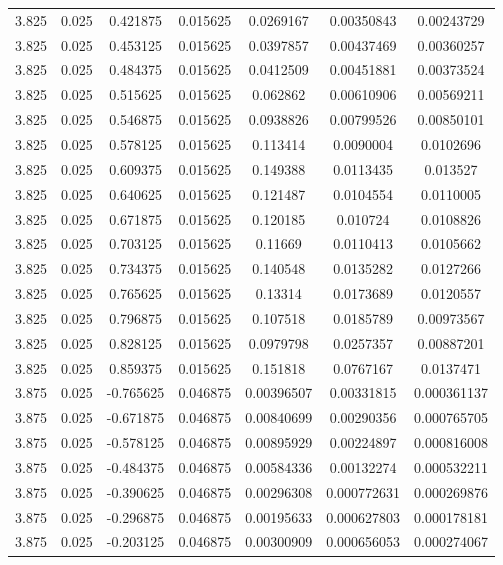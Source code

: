 \begin{table}[bh]
\begin{center}
{\begin{tabular}{ccccccc}
3.825	 & 0.025 & 	0.421875	 & 0.015625	 & 0.0269167	 & 0.00350843	 & 0.00243729 \\ 
3.825	 & 0.025 & 	0.453125	 & 0.015625	 & 0.0397857	 & 0.00437469	 & 0.00360257 \\ 
3.825	 & 0.025 & 	0.484375	 & 0.015625	 & 0.0412509	 & 0.00451881	 & 0.00373524 \\ 
3.825	 & 0.025 & 	0.515625	 & 0.015625	 & 0.062862	 & 0.00610906	 & 0.00569211 \\ 
3.825	 & 0.025 & 	0.546875	 & 0.015625	 & 0.0938826	 & 0.00799526	 & 0.00850101 \\ 
3.825	 & 0.025 & 	0.578125	 & 0.015625	 & 0.113414	 & 0.0090004	 & 0.0102696 \\ 
3.825	 & 0.025 & 	0.609375	 & 0.015625	 & 0.149388	 & 0.0113435	 & 0.013527 \\ 
3.825	 & 0.025 & 	0.640625	 & 0.015625	 & 0.121487	 & 0.0104554	 & 0.0110005 \\ 
3.825	 & 0.025 & 	0.671875	 & 0.015625	 & 0.120185	 & 0.010724	 & 0.0108826 \\ 
3.825	 & 0.025 & 	0.703125	 & 0.015625	 & 0.11669	 & 0.0110413	 & 0.0105662 \\ 
3.825	 & 0.025 & 	0.734375	 & 0.015625	 & 0.140548	 & 0.0135282	 & 0.0127266 \\ 
3.825	 & 0.025 & 	0.765625	 & 0.015625	 & 0.13314	 & 0.0173689	 & 0.0120557 \\ 
3.825	 & 0.025 & 	0.796875	 & 0.015625	 & 0.107518	 & 0.0185789	 & 0.00973567 \\ 
3.825	 & 0.025 & 	0.828125	 & 0.015625	 & 0.0979798	 & 0.0257357	 & 0.00887201 \\ 
3.825	 & 0.025 & 	0.859375	 & 0.015625	 & 0.151818	 & 0.0767167	 & 0.0137471 \\ 
3.875	 & 0.025 & 	-0.765625	 & 0.046875	 & 0.00396507	 & 0.00331815	 & 0.000361137 \\ 
3.875	 & 0.025 & 	-0.671875	 & 0.046875	 & 0.00840699	 & 0.00290356	 & 0.000765705 \\ 
3.875	 & 0.025 & 	-0.578125	 & 0.046875	 & 0.00895929	 & 0.00224897	 & 0.000816008 \\ 
3.875	 & 0.025 & 	-0.484375	 & 0.046875	 & 0.00584336	 & 0.00132274	 & 0.000532211 \\ 
3.875	 & 0.025 & 	-0.390625	 & 0.046875	 & 0.00296308	 & 0.000772631	 & 0.000269876 \\ 
3.875	 & 0.025 & 	-0.296875	 & 0.046875	 & 0.00195633	 & 0.000627803	 & 0.000178181 \\ 
3.875	 & 0.025 & 	-0.203125	 & 0.046875	 & 0.00300909	 & 0.000656053	 & 0.000274067 \\ 

\end{tabular}}
\end{center}
\end{table}
